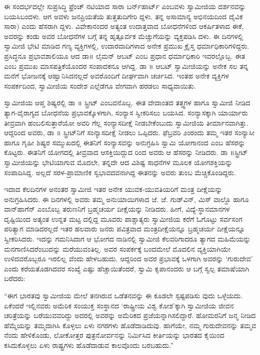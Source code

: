 ಈ ಸಂದರ್ಭದಲ್ಲೇ ಸುಪ್ರಸಿದ್ಧಿ ಫ್ರೆಂಚ್ ನಟಿಯಾದ ಸಾರಾ ಬರ್ನ್​ಹಾರ್ಟ್ ಎಂಬವಳು ಸ್ವಾಮೀಜಿಯ ದರ್ಶನವನ್ನು ಬಯಸಿಬಂದಳು. ಆಗ ಅವಳು ಜನಪ್ರಿಯತೆಯ ತುತ್ತತುದಿಗೇರಿ ದ್ದಳು. ತನ್ನ ಅಸಾಮಾನ್ಯ ಅಭಿನಯದಿಂದ ದೈವಿಕ ಸಾರಾ) ಎಂದು ಹೆಸರಾಗಿ ದ್ದಳು. ವಿವೇಕಾನಂದರ ಅತ್ಯಂತ ಉದಾತ್ತವಾದ ಬೋಧನೆಗಳಿಂದ ಆಕರ್ಷಿತಳಾದ ಈಕೆ, ಅವರನ್ನು ಕಂಡು ಅವರ ಬೋಧನೆಗಳ ಬಗ್ಗೆ ತನ್ನ ಹೃತ್ಪೂರ್ವಕ ಮೆಚ್ಚುಗೆಯನ್ನು ವ್ಯಕ್ತಪಡಿಸಿ ದಳು. ಈ ದಿನಗಳಲ್ಲಿ ಸ್ವಾಮೀಜಿ ಭೇಟಿ ಮಾಡಿದ ಗಣ್ಯ ವ್ಯಕ್ತಿಗಳಲ್ಲಿ, ಉದಾರವಾದಿಗಳಾದ ಅನೇಕ ಪ್ರಮುಖ ಕ್ರೈಸ್ತ ಧರ್ಮಾಧಿಕಾರಿಗಳಿದ್ದರು. ಪ್ರಸಿದ್ಧನೂ ಪ್ರಭಾವಶಾಲಿಯೂ ಆದ ಡಾ॥ ಲೈಮನ್ ಆಬಟ್ ಎಂಬ ಪ್ರಧಾನ ಧರ್ಮಾಧಿಕಾರಿ ಇವರಲ್ಲೊಬ್ಬ. ಈತ ಎಂಬ ಪ್ರಮುಖ ಮಾಸಪತ್ರಿಕೆಯೊಂದರ ಸಂಪಾದಕನೂ ಆಗಿದ್ದ. ಡಾ ॥ ಆಬಟ್ ಸ್ವಾಮೀಜಿಯನ್ನು ಅನೇಕ ಸಲ ತನ್ನ ಮನೆಗೆ ಭೋಜನಕ್ಕೆ ಆಹ್ವಾನಿಸಿದನಲ್ಲದೆ ಅವರೊಂದಿಗೆ ದೀರ್ಘವಾಗಿ ಚರ್ಚಿಸಿದ. ಇಂತಹ ಅನೇಕ ವ್ಯಕ್ತಿಗಳ ಸಂಪರ್ಕದಿಂದ, ಸ್ವಾಮೀಜಿಯ ಸಂದೇಶ ಎಲ್ಲೆಡೆಗೂ ವೇಗವಾಗಿ ಹರಡಲು ಸಾಧ್ಯವಾಯಿತು.

ಸ್ವಾಮೀಜಿಯ ಆಪ್ತ ಶಿಷ್ಯರಲ್ಲಿ ಡಾ ॥ ಸ್ಟ್ರೀಟ್ ಎಂಬವನೊಬ್ಬ. ಈತ ವೇದಾಂತದ ತತ್ತ್ವಗಳ ಹಾಗೂ ಸ್ವಾಮೀಜಿ ನೀಡಿದ ತ್ಯಾಗ-ವೈರಾಗ್ಯದ ಬೋಧನೆಯ ಪ್ರಭಾವಕ್ಕೊಳಗಾಗಿ, ಸಂನ್ಯಾಸ ಸ್ವೀಕರಿಸಲು ಬಯಸಿದ. ಸಂನ್ಯಾಸಕ್ಕಾಗಿ ಯಾರ್ಯಾರು ತೀವ್ರವಾಗಿ ಹಂಬಲಿಸುತ್ತಾರೆಯೋ ಅವರಿ ಗೆಲ್ಲ ಸಂನ್ಯಾಸದೀಕ್ಷೆ ನೀಡಬೇಕೆಂಬುದು ಸ್ವಾಮೀಜಿಯ ತೀರ್ಮಾನವಾಗಿತ್ತು. ಆದ್ದರಿಂದ ಅವರು, ಡಾ ॥ ಸ್ಟ್ರೀಟ್​ನಿಗೆ ಸಂನ್ಯಾಸದೀಕ್ಷೆ ನೀಡಲು ಒಪ್ಪಿದರು. ಫೆಬ್ರವರಿ ೨ಂರಂದು ತಮ್ಮ ಇತರ ಸಂನ್ಯಾಸೀ ಹಾಗೂ ಗೃಹೀ ಶಿಷ್ಯರ ಸಮ್ಮುಖದಲ್ಲಿ ಈತನಿಗೆ ಸಂನ್ಯಾಸವನ್ನು ಅನುಗ್ರಹಿಸಿ ಸ್ವಾಮಿ ಯೋಗಾನಂದ ಎಂಬ ಹೆಸರನ್ನು ಕೊಟ್ಟರು. ಈತನಿಗೆ ಯೋಗದಲ್ಲಿ ತೀವ್ರವಾದ ಆಸಕ್ತಿಯಿದ್ದುದ ರಿಂದ ಅವರು ಆ ಹೆಸರನ್ನು ನೀಡಿದರು. ಡಾ ॥ಸ್ಟ್ರೀಟ್ ಸ್ವಾಮೀಜಿಯನ್ನು ಭೇಟಿಯಾಗುವ ಮೊದಲೇ, ತನ್ನದೇ ಆದ ವಿಶಿಷ್ಟ ಸಾಧನೆಗಳ ಮೂಲಕ ಯೋಗಶಕ್ತಿಯನ್ನು ಸಂಪಾದಿಸಿದ್ದ. ಅಲ್ಲದೆ ಸರಳ-ಪ್ರಾಮಾಣಿಕ ಸ್ವಭಾವದವನಾಗಿದ್ದ ಈತನನ್ನು ಅವರು ತುಂಬ ಮೆಚ್ಚಿಕೊಂಡಿದ್ದರು.

ಇದಾದ ಕೆಲದಿನಗಳ ಅನಂತರ ಸ್ವಾಮೀಜಿ ಇತರ ಅನೇಕ ಯುವಕ-ಯುವತಿಯರಿಗೆ ಮಂತ್ರ ದೀಕ್ಷೆಯನ್ನು ಅನುಗ್ರಹಿಸಿದರು. ಈ ದಿನಗಳಲ್ಲಿ ಅವರು ತಮ್ಮ ಅನುಯಾಯಿಗಳಾದ ಜೆ. ಜೆ. ಗುಡ್​ವಿನ್, ಮಿಸ್ ವಾಲ್ಡೊ ಹಾಗೂ ವಾನ್​ಹಾಗೆನ್ ಎಂಬೊಬ್ಬ ತರುಣನಿಗೆ ಬ್ರಹ್ಮಚರ್ಯ ದೀಕ್ಷೆಯನ್ನು ನೀಡಿದರು. ಹೀಗೆ, ವಿದ್ಯೆ-ಸ್ಥಾನಮಾನಗಳ ದೃಷ್ಟಿಯಿಂದ ಅತ್ಯಂತ ಉನ್ನತ ಮಟ್ಟ ದಲ್ಲಿದ್ದ ಮೂವರು ಪಾಶ್ಚಾತ್ಯರು ಸ್ವಾಮೀಜಿಯ ಕರೆಗೆ ಓಗೊಟ್ಟು ಸರ್ವಸಂಗ ಪರಿತ್ಯಾಗ ಮಾಡಿದರಲ್ಲದೆ ಇತರ ಹಲವಾರು ಜನರು ಪವಿತ್ರವಾದ ಮಂತ್ರದೀಕ್ಷೆಯನ್ನೂ ಬ್ರಹ್ಮಚರ್ಯ ದೀಕ್ಷೆಯನ್ನೂ ಸ್ವೀಕರಿಸಿದರು. ಇದನ್ನು ಗಮನಿಸಿದಾಗ ಆ ಭೋಗದ ನಾಡಿನಲ್ಲಿ ಸ್ವಾಮೀಜಿ ಕೆಲವರಿಗಾದರೂ ತ್ಯಾಗದ ಮಹಿಮೆಯನ್ನು ಮನಗಾಣಿಸಿದರೆಂಬುದನ್ನು ಮರೆಯುವಂತಿಲ್ಲ. ಅವರ ಸಂಪರ್ಕಕ್ಕೆ ಬಂದಮೇಲೆ ಮೊದಲಿನ ವ್ಯಕ್ತಿಯಾಗಿಯೇ ಉಳಿದವರೊಬ್ಬರೂ ಇರಲಿಲ್ಲ ವೆಂದು ಹೇಳಬಹುದು. ಆದ್ದರಿಂದ ಅವರ ಪ್ರಭಾವಕ್ಕೆ ಒಳಗಾಗಿ ಅವರನ್ನು ‘ಗುರುದೇವ’ ಎಂದು ಕರೆಯತೊಡಗಿದವರ ಸಂಖ್ಯೆ ಎಷ್ಟು ಹೆಚ್ಚಾಯಿತೆಂದರೆ, ಸ್ವಾಮಿ ಕೃಪಾನಂದರು ಆ ಬಗ್ಗೆ ಸ್ವಲ್ಪ ತಮಾಷೆಯಾಗಿ ಬರೆದರು:

“ಈಗ ಭಾರತವು ಸ್ವಾಮೀಜಿಯ ಮೇಲೆ ತನಗಿರುವ ಒಡೆತನವನ್ನು ಈ ಕೂಡಲೇ ಸ್ಪಷ್ಟಪಡಿಸು ವುದು ಒಳ್ಳೆಯದು. ಏಕೆಂದರೆ ಇಲ್ಲಿನವರು ಅಮೆರಿಕ ಸಂಯುಕ್ತ ಸಂಸ್ಥಾನದ ‘ರಾಷ್ಟ್ರೀಯ ವಿಶ್ವ ಕೋಶ’ಕ್ಕಾಗಿ ಸ್ವಾಮೀಜಿಯ ಜೀವನ ಚರಿತ್ರೆಯನ್ನು ಬರೆಯುವವರಿದ್ದು ಅದರಲ್ಲಿ ಅವರನ್ನು ಅಮೆರಿಕದ ಪ್ರಜೆಯನ್ನಾಗಿಸಲಿದ್ದಾರೆ. ಹೋಮರನಿಗೆ ಜನ್ಮ ನೀಡಿದ ಹೆಮ್ಮೆಯನ್ನು ತಮ್ಮದಾಗಿಸಿ ಕೊಳ್ಳಲು ಏಳು ನಗರಗಳು ಹೊಡೆದಾಡಿದುವು. ಹಾಗೆಯೇ, ನಮ್ಮ ಗುರುದೇವನನ್ನು ತಮ್ಮವ ನೆಂದು ಹೇಳಿಕೊಂಡು, ಲೋಕೋತ್ತರ ಪುತ್ರನೋರ್ವನನ್ನು ನಿರ್ಮಿಸಿದ ಕೀರ್ತಿಯನ್ನು ಭಾರತದ ಕೈಯಿಂದ ಕಸಿದುಕೊಳ್ಳಲು ಏಳು ರಾಷ್ಟ್ರಗಳು ಹೊಡೆದಾಡುವ ಕಾಲವೊಂದು ಬರಬಹುದು.”

